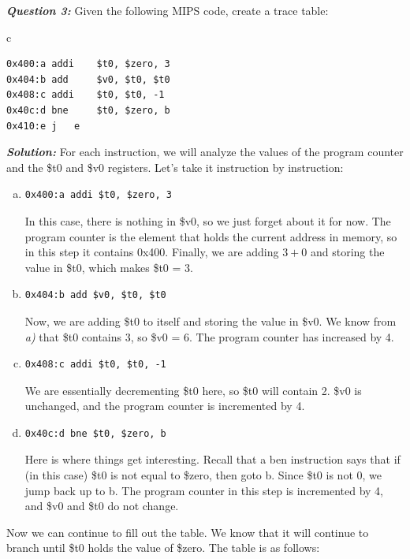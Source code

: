 \documentclass{article}
\begin{document}
\indent \textit{\textbf{Question 3:}} Given the following MIPS code, create a trace table:
\begin{center} 
\begin{tabular}{c}
\begin{lstlisting}
0x400:a addi 	$t0, $zero, 3
0x404:b add 	$v0, $t0, $t0 
0x408:c addi 	$t0, $t0, -1
0x40c:d bne 	$t0, $zero, b
0x410:e j 	e
\end{lstlisting}
\end{tabular}
\end{center}
\noindent \textit{\textbf{Solution:}} For each instruction, we will analyze the values of the program counter and the \$t0 and \$v0 registers. Let's take it instruction by instruction:
\begin{enumerate}[a)]
\item 
\begin{lstlisting}
0x400:a addi $t0, $zero, 3
\end{lstlisting}
\noindent In this case, there is nothing in \$v0, so we just forget about it for now. The program counter is the element that holds the current address in memory, so in this step it contains 0x400. Finally, we are adding $3 + 0$ and storing the value in \$t0, which makes \$t0 = 3.
\item
\begin{lstlisting}
0x404:b add $v0, $t0, $t0 
\end{lstlisting}
\noindent Now, we are adding \$t0 to itself and storing the value in \$v0. We know from \textit{a)} that \$t0 contains 3, so \$v0 = 6. The program counter has increased by 4.
\item 
\begin{lstlisting}
0x408:c addi $t0, $t0, -1
\end{lstlisting}
\noindent We are essentially decrementing \$t0 here, so \$t0 will contain 2. \$v0 is unchanged, and the program counter is incremented by 4.
\item 
\begin{lstlisting}
0x40c:d bne $t0, $zero, b
\end{lstlisting}
\noindent Here is where things get interesting. Recall that a ben instruction says that if (in this case) \$t0 is not equal to \$zero, then goto b. Since \$t0 is not 0, we jump back up to b. The program counter in this step is incremented by 4, and \$v0 and \$t0 do not change.
\end{enumerate}
\noindent Now we can continue to fill out the table. We know that it will continue to branch until \$t0 holds the value of \$zero. The table is as follows:
\end{document}
